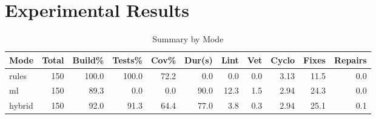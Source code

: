 \documentclass{article}
\begin{document}
\section*{Experimental Results}

\begin{table}[h]
\centering
\caption{Summary by Mode}
\begin{tabular}{lrrrrrrrrrr}
\toprule
Mode & Total & Build\% & Tests\% & Cov\% & Dur(s) & Lint & Vet & Cyclo & Fixes & Repairs \\
\midrule
rules & 150 & 100.0 & 100.0 & 72.2 & 0.0 & 0.0 & 0.0 & 3.13 & 11.5 & 0.0 \\
ml & 150 & 89.3 & 0.0 & 0.0 & 90.0 & 12.3 & 1.5 & 2.94 & 24.3 & 0.0 \\
hybrid & 150 & 92.0 & 91.3 & 64.4 & 77.0 & 3.8 & 0.3 & 2.94 & 25.1 & 0.1 \\
\bottomrule
\end{tabular}
\end{table}
\end{document}
